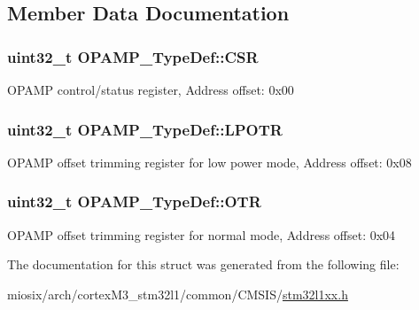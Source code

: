 \subsection{Member Data Documentation}
\hypertarget{struct_o_p_a_m_p___type_def_aa3123f8a6ca8605b6687b9ee3f11e8ef}{
\subsubsection[{C\-S\-R}]{ uint32\-\_\-t O\-P\-A\-M\-P\-\_\-\-Type\-Def\-::\-C\-S\-R}}\label{struct_o_p_a_m_p___type_def_aa3123f8a6ca8605b6687b9ee3f11e8ef}
O\-P\-A\-M\-P control/status register, Address offset\-: 0x00 \hypertarget{struct_o_p_a_m_p___type_def_a285131c897741d5290937f8f4f297e08}{
\subsubsection[{L\-P\-O\-T\-R}]{ uint32\-\_\-t O\-P\-A\-M\-P\-\_\-\-Type\-Def\-::\-L\-P\-O\-T\-R}}\label{struct_o_p_a_m_p___type_def_a285131c897741d5290937f8f4f297e08}
O\-P\-A\-M\-P offset trimming register for low power mode, Address offset\-: 0x08 \hypertarget{struct_o_p_a_m_p___type_def_a6a80544bc693d9c51045b3652c43fd22}{
\subsubsection[{O\-T\-R}]{ uint32\-\_\-t O\-P\-A\-M\-P\-\_\-\-Type\-Def\-::\-O\-T\-R}}\label{struct_o_p_a_m_p___type_def_a6a80544bc693d9c51045b3652c43fd22}
O\-P\-A\-M\-P offset trimming register for normal mode, Address offset\-: 0x04 

The documentation for this struct was generated from the following file\-:\begin{DoxyCompactItemize}
\item 
miosix/arch/cortex\-M3\-\_\-stm32l1/common/\-C\-M\-S\-I\-S/\hyperlink{stm32l1xx_8h}{stm32l1xx.\-h}\end{DoxyCompactItemize}
